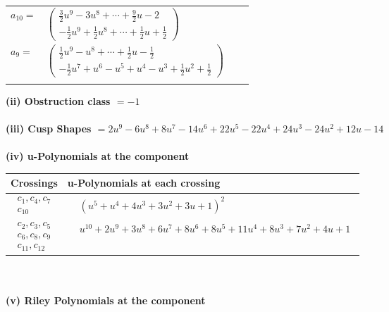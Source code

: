 \documentclass[1p]{elsarticle_modified}
\theoremstyle{definition}
\begin{document}
\begin{tabular}{m{7pt} m{180pt} m{7pt} m{180pt} }
\flushright $a_{10}=$&$\begin{pmatrix}\frac{3}{2} u^9-3 u^8+\cdots+\frac{9}{2} u-2\\-\frac{1}{2} u^9+\frac{1}{2} u^8+\cdots+\frac{1}{2} u+\frac{1}{2}\end{pmatrix}$ \\
\flushright $a_{9}=$&$\begin{pmatrix}\frac{1}{2} u^9- u^8+\cdots+\frac{1}{2} u-\frac{1}{2}\\-\frac{1}{2} u^7+u^6- u^5+u^4- u^3+\frac{1}{2} u^2+\frac{1}{2}\end{pmatrix}$\\&\end{tabular}
\flushleft \textbf{(ii) Obstruction class $= -1$}\\~\\
\flushleft \textbf{(iii) Cusp Shapes $= 2 u^9-6 u^8+8 u^7-14 u^6+22 u^5-22 u^4+24 u^3-24 u^2+12 u-14$}\\~\\
\newpage\renewcommand{\arraystretch}{1}
\flushleft \textbf{(iv) u-Polynomials at the component}\newline \\
\begin{tabular}{m{50pt}|m{274pt}}
Crossings & \hspace{64pt}u-Polynomials at each crossing \\
\hline $$\begin{aligned}c_{1},c_{4},c_{7}\\c_{10}\end{aligned}$$&$\begin{aligned}
&(u^5+u^4+4 u^3+3 u^2+3 u+1)^2
\end{aligned}$\\
\hline $$\begin{aligned}c_{2},c_{3},c_{5}\\c_{6},c_{8},c_{9}\\c_{11},c_{12}\end{aligned}$$&$\begin{aligned}
&u^{10}+2 u^9+3 u^8+6 u^7+8 u^6+8 u^5+11 u^4+8 u^3+7 u^2+4 u+1
\end{aligned}$\\
\hline
\end{tabular}\\~\\
\newpage\renewcommand{\arraystretch}{1}
\flushleft \textbf{(v) Riley Polynomials at the component}\newline \\
\end{document}
